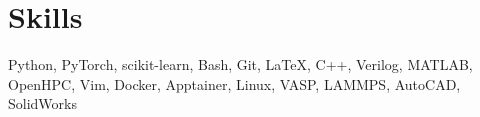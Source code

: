 \section{Skills}
Python, PyTorch, scikit-learn, Bash, Git, \LaTeX, C++, Verilog, MATLAB, OpenHPC, Vim, Docker, Apptainer, Linux, VASP, LAMMPS, AutoCAD, SolidWorks
